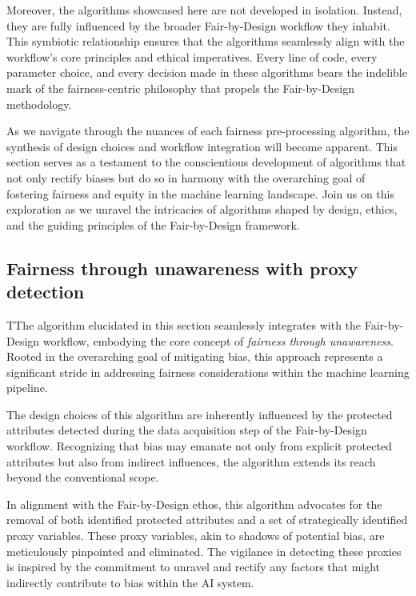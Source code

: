 Moreover, the algorithms showcased here are not developed in isolation. Instead, they are fully influenced by the broader Fair-by-Design workflow they inhabit. This symbiotic relationship ensures that the algorithms seamlessly align with the workflow's core principles and ethical imperatives. Every line of code, every parameter choice, and every decision made in these algorithms bears the indelible mark of the fairness-centric philosophy that propels the Fair-by-Design methodology.

As we navigate through the nuances of each fairness pre-processing algorithm, the synthesis of design choices and workflow integration will become apparent. This section serves as a testament to the conscientious development of algorithms that not only rectify biases but do so in harmony with the overarching goal of fostering fairness and equity in the machine learning landscape. Join us on this exploration as we unravel the intricacies of algorithms shaped by design, ethics, and the guiding principles of the Fair-by-Design framework.

\subsection{Fairness through unawareness with proxy detection}

TThe algorithm elucidated in this section seamlessly integrates with the Fair-by-Design workflow, embodying the core concept of \emph{fairness through unawareness}. Rooted in the overarching goal of mitigating bias, this approach represents a significant stride in addressing fairness considerations within the machine learning pipeline.

The design choices of this algorithm are inherently influenced by the protected attributes detected during the data acquisition step of the Fair-by-Design workflow. Recognizing that bias may emanate not only from explicit protected attributes but also from indirect influences, the algorithm extends its reach beyond the conventional scope.

In alignment with the Fair-by-Design ethos, this algorithm advocates for the removal of both identified protected attributes and a set of strategically identified proxy variables. These proxy variables, akin to shadows of potential bias, are meticulously pinpointed and eliminated. The vigilance in detecting these proxies is inspired by the commitment to unravel and rectify any factors that might indirectly contribute to bias within the AI system.

